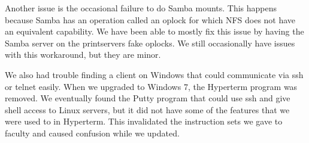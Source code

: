 Another issue is the occasional failure to do Samba mounts.  This happens because Samba has an operation called an oplock for which NFS does not have an equivalent capability.  We have been able to mostly fix this issue by having the Samba server on the printservers fake oplocks.  We still occasionally have issues with this workaround, but they are minor.  

We also had trouble finding a client on Windows that could communicate via ssh or telnet easily.  When we upgraded to Windows 7, the Hyperterm program was removed.  We eventually found the Putty program that could use ssh and give shell access to Linux servers, but it did not have some of the features that we were used to in Hyperterm.  This invalidated the instruction sets we gave to faculty and caused confusion while we updated.  
